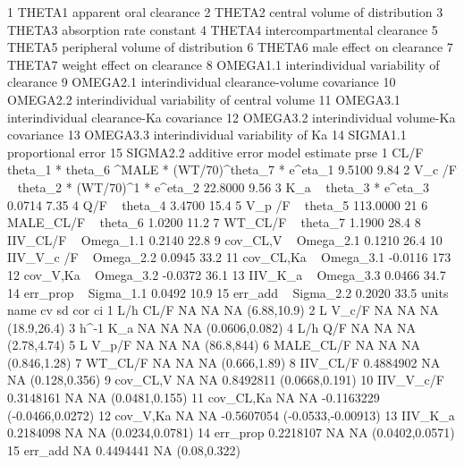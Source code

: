 \begin{Schunk}
\begin{Soutput}
1     THETA1                       apparent oral clearance
2     THETA2                central volume of distribution
3     THETA3                      absorption rate constant
4     THETA4                  intercompartmental clearance
5     THETA5             peripheral volume of distribution
6     THETA6                      male effect on clearance
7     THETA7                    weight effect on clearance
8   OMEGA1.1      interindividual variability of clearance
9   OMEGA2.1   interindividual clearance-volume covariance
10  OMEGA2.2 interindividual variability of central volume
11  OMEGA3.1       interindividual clearance-Ka covariance
12  OMEGA3.2          interindividual volume-Ka covariance
13  OMEGA3.3             interindividual variability of Ka
14  SIGMA1.1                            proportional error
15  SIGMA2.2                                additive error
                                                           model estimate prse
1  CL/F  ~ theta_1 *  theta_6 ^MALE * (WT/70)^theta_7  * e^eta_1   9.5100 9.84
2                        V_c /F  ~ theta_2 * (WT/70)^1 * e^eta_2  22.8000 9.56
3                                       K_a  ~ theta_3 * e^eta_3   0.0714 7.35
4                                                 Q/F  ~ theta_4   3.4700 15.4
5                                              V_p /F  ~ theta_5 113.0000   21
6                                            MALE_CL/F ~ theta_6   1.0200 11.2
7                                              WT_CL/F ~ theta_7   1.1900 28.4
8                                           IIV_CL/F ~ Omega_1.1   0.2140 22.8
9                                           cov_CL,V ~ Omega_2.1   0.1210 26.4
10                                        IIV_V_c /F ~ Omega_2.2   0.0945 33.2
11                                        cov_CL,Ka  ~ Omega_3.1  -0.0116  173
12                                         cov_V,Ka  ~ Omega_3.2  -0.0372 36.1
13                                          IIV_K_a  ~ Omega_3.3   0.0466 34.7
14                                          err_prop ~ Sigma_1.1   0.0492 10.9
15                                           err_add ~ Sigma_2.2   0.2020 33.5
   units      name        cv        sd        cor                 ci
1    L/h      CL/F        NA        NA         NA        (6.88,10.9)
2      L     V_c/F        NA        NA         NA        (18.9,26.4)
3  h^-1        K_a        NA        NA         NA     (0.0606,0.082)
4    L/h       Q/F        NA        NA         NA        (2.78,4.74)
5      L     V_p/F        NA        NA         NA         (86.8,844)
6        MALE_CL/F        NA        NA         NA       (0.846,1.28)
7          WT_CL/F        NA        NA         NA       (0.666,1.89)
8         IIV_CL/F 0.4884902        NA         NA      (0.128,0.356)
9         cov_CL,V        NA        NA  0.8492811     (0.0668,0.191)
10       IIV_V_c/F 0.3148161        NA         NA     (0.0481,0.155)
11       cov_CL,Ka        NA        NA -0.1163229   (-0.0466,0.0272)
12        cov_V,Ka        NA        NA -0.5607054 (-0.0533,-0.00913)
13         IIV_K_a 0.2184098        NA         NA    (0.0234,0.0781)
14        err_prop 0.2218107        NA         NA    (0.0402,0.0571)
15         err_add        NA 0.4494441         NA       (0.08,0.322)
\end{Soutput}
\end{Schunk}
